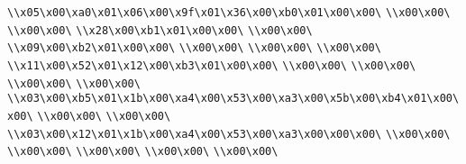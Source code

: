 \verb|\\x05\x00\xa0\x01\x06\x00\x9f\x01\x36\x00\xb0\x01\x00\x00\|\newline
\verb|\\x00\x00\|\newline
\verb|\\x00\x00\|\newline
\verb|\\x28\x00\xb1\x01\x00\x00\|\newline
\verb|\\x00\x00\|\newline
\verb|\\x09\x00\xb2\x01\x00\x00\|\newline
\verb|\\x00\x00\|\newline
\verb|\\x00\x00\|\newline
\verb|\\x00\x00\|\newline
\verb|\\x11\x00\x52\x01\x12\x00\xb3\x01\x00\x00\|\newline
\verb|\\x00\x00\|\newline
\verb|\\x00\x00\|\newline
\verb|\\x00\x00\|\newline
\verb|\\x00\x00\|\newline
\verb|\\x03\x00\xb5\x01\x1b\x00\xa4\x00\x53\x00\xa3\x00\x5b\x00\xb4\x01\x00\x00\|\newline
\verb|\\x00\x00\|\newline
\verb|\\x00\x00\|\newline
\verb|\\x03\x00\x12\x01\x1b\x00\xa4\x00\x53\x00\xa3\x00\x00\x00\|\newline
\verb|\\x00\x00\|\newline
\verb|\\x00\x00\|\newline
\verb|\\x00\x00\|\newline
\verb|\\x00\x00\|\newline
\verb|\\x00\x00\|\newline
